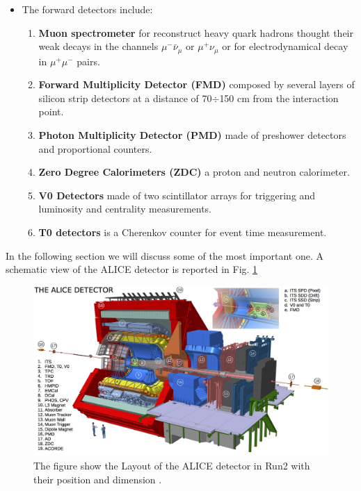 \documentclass[12pt,a4paper]{book}
\begin{document}
\begin{itemize}
\begin{enumerate}
		\end{enumerate}
		\item 	The forward detectors include:
		\begin{enumerate}
			\item \textbf{Muon spectrometer} for reconstruct heavy quark hadrons thought their weak decays in the channels $\mu^- \bar{\nu}_\mu$ or $\mu^+ \nu_\mu$  or for electrodynamical decay in $\mu^+ \mu^-$ pairs.
			\item \textbf{Forward Multiplicity Detector (FMD)} composed by several layers of silicon strip detectors at a distance of 70$\div$150 cm from the interaction point.
			\item \textbf{Photon Multiplicity Detector (PMD)} made of preshower detectors and proportional counters.
			\item \textbf{Zero Degree Calorimeters (ZDC)} a proton and neutron calorimeter.
			\item \textbf{V0 Detectors} made of two scintillator arrays for triggering and luminosity and centrality measurements.
			\item \textbf{T0 detectors} is a Cherenkov counter for event time measurement.
		\end{enumerate}
	\end{itemize}
	
	In the following section we will discuss some of the most important one. A schematic view of the ALICE detector is reported in Fig. \ref{fig:ALICE_instruments}
	\begin{figure}[h]
		\centering
		\includegraphics[width=1\textwidth]{pictures/ALICE_instruments.png}
		\caption{The figure show the Layout of the ALICE detector in Run2 with their position and dimension \cite{Botta:2017bwj}.}
		\label{fig:ALICE_instruments}
	\end{figure}
	
\end{document}

